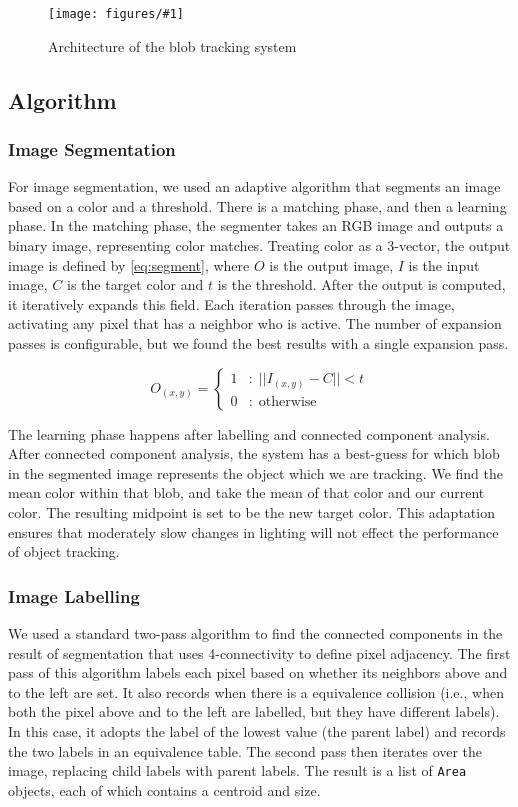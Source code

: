 \documentclass[letterpaper]{article}
\newcommand\code[1]{\texttt{#1}}
\newcommand\imgfig[4]{
\begin{figure}[h]
  \centering
  \texttt{[image: figures/\#1]}
  \caption{#3}
  \label{fig:#4}
\end{figure}}
\begin{document}
\imgfig{blob}{.5}{Architecture of the blob tracking system}{blob}

\subsection{Algorithm}
\subsubsection{Image Segmentation}
For image segmentation, we used an adaptive algorithm that segments an
image based on a color and a threshold. There is a matching phase, and
then a learning phase. In the matching phase, the segmenter takes an
RGB image and outputs a binary image, representing color
matches. Treating color as a 3-vector, the output image is defined by
\ref{eq:segment}, where $O$ is the output image, $I$ is the input
image, $C$ is the target color and $t$ is the threshold. After the
output is computed, it iteratively expands this field. Each iteration
passes through the image, activating any pixel that has a neighbor who
is active. The number of expansion passes is configurable, but we
found the best results with a single expansion pass.

\begin{equation}
  \label{eq:segment}
  O_{(x,y)} = \left\{ 
    \begin{array}{rl}
      1 &:\; || I_{(x,y)} - C || < t \\
      0 &:\; \mathrm{otherwise}
    \end{array} \right.
\end{equation}

The learning phase happens after labelling and connected component
analysis. After connected component analysis, the system has a
best-guess for which blob in the segmented image represents the object
which we are tracking. We find the mean color within that blob, and
take the mean of that color and our current color. The resulting
midpoint is set to be the new target color. This adaptation ensures
that moderately slow changes in lighting will not effect the
performance of object tracking.

\subsubsection{Image Labelling}
We used a standard two-pass algorithm to find the connected components
in the result of segmentation that uses 4-connectivity to define pixel
adjacency. The first pass of this algorithm labels each pixel based on
whether its neighbors above and to the left are set. It also records
when there is a equivalence collision (i.e., when both the pixel above
and to the left are labelled, but they have different labels). In this
case, it adopts the label of the lowest value (the parent label) and
records the two labels in an equivalence table. The second pass then
iterates over the image, replacing child labels with parent
labels. The result is a list of \code{Area} objects, each of which
contains a centroid and size.
\end{document}
